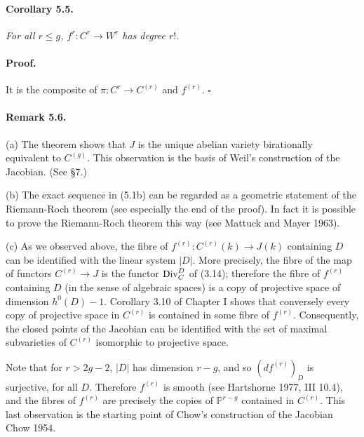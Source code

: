 \paragraph{Corollary 5.5.}
\textit{For all $r \le g$, $f^r \colon C^r \to W^r$ has degree $r!$.}

\paragraph{Proof.}
It is the composite of $\pi \colon C^r \to C^{(r)}$ and $f^{(r)}$.
\hfill $\square$

\paragraph{Remark 5.6.}
(a) The theorem shows that $J$ is the unique abelian variety birationally
equivalent to $C^{(g)}$. This observation is the basis of Weil's construction
of the Jacobian. (See \S 7.)

(b) The exact sequence in (5.1b) can be regarded as a geometric statement of
the Riemann-Roch theorem (see especially the end of the proof). In fact it is
possible to prove the Riemann-Roch theorem this way (see Mattuck and Mayer
1963).

(c) As we observed above, the fibre of
$f^{(r)} \colon C^{(r)}(k) \to J(k)$ containing $D$ can be identified with
the linear system $|D|$. More precisely, the fibre of the map of functors
$C^{(r)} \to J$ is the functor $\operatorname{Div}_C^D$ of (3.14); therefore the fibre of
$f^{(r)}$ containing $D$ (in the sense of algebraic spaces) is a copy of
projective space of dimension $h^0(D) - 1$. Corollary 3.10 of Chapter I shows
that conversely every copy of projective space in $C^{(r)}$ is contained in
some fibre of $f^{(r)}$. Consequently, the closed points of the Jacobian can
be identified with the set of maximal subvarieties of $C^{(r)}$ isomorphic to
projective space.

Note that for $r > 2g - 2$, $|D|$ has dimension $r - g$, and so
$(df^{(r)})_D$ is surjective, for all $D$. Therefore $f^{(r)}$ is smooth (see
Hartshorne 1977, III 10.4), and the fibres of $f^{(r)}$ are precisely the
copies of $\mathbb{P}^{r-g}$ contained in $C^{(r)}$. This last observation is
the starting point of Chow's construction of the Jacobian Chow 1954.

